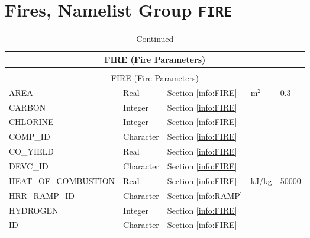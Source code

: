 \clearpage
\section{Fires, Namelist Group \texorpdfstring{{\tt FIRE}}{FIRE}}
\label{info:FIRE3}
\begin{longtable}{@{\extracolsep{\fill}}|l|l|l|l|l|}
\caption[Fire Parameters ({\ct FIRE} namelist group)]{For more information see Section~\ref{info:FIRE}.}
\label{tbl:FIRE} \\
\hline
\multicolumn{5}{|c|}{{\ct FIRE} (Fire Parameters)} \\
\hline \hline
\endfirsthead
\caption[]{Continued} \\
\hline
\multicolumn{5}{|c|}{{\ct FIRE} (Fire Parameters)} \\
\hline \hline
\endhead
{\ct AREA}                 & Real        & Section \ref{info:FIRE}     & m$^2$                       &      0.3       \\ \hline
{\ct CARBON}               & Integer     & Section \ref{info:FIRE}                 &                             &                 \\ \hline
{\ct CHLORINE}             & Integer     & Section \ref{info:FIRE}                 &                             &                 \\ \hline
{\ct COMP\_ID}             & Character   & Section \ref{info:FIRE}                 &                             &                 \\ \hline
{\ct CO\_YIELD}            & Real        & Section \ref{info:FIRE}                 &                             &                 \\ \hline
{\ct DEVC\_ID}             & Character   & Section \ref{info:FIRE}                 &                             &                 \\ \hline
{\ct HEAT\_OF\_COMBUSTION} & Real        & Section \ref{info:FIRE}                 & kJ/kg                       &     50000    \\ \hline
{\ct HRR\_RAMP\_ID}           & Character   &  Section \ref{info:RAMP}                 &                             &                 \\ \hline
{\ct HYDROGEN}             & Integer     & Section \ref{info:FIRE}                 &                             &                 \\ \hline
{\ct ID}                   & Character   & Section \ref{info:FIRE}                 &                             &                 \\ \hline

\end{longtable}
